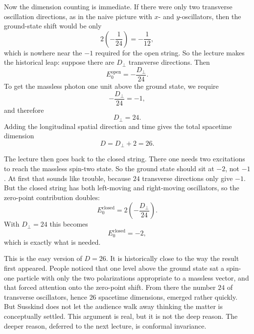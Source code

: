 Now the dimension counting is immediate. If there were only two transverse oscillation directions, as in the naive picture with \(x\)- and \(y\)-oscillators, then the ground-state shift would be only
\begin{equation}
2\left(-\frac{1}{24}\right)=-\frac{1}{12},
\end{equation}
which is nowhere near the \(-1\) required for the open string. So the lecture makes the historical leap: suppose there are \(D_{\perp}\) transverse directions. Then
\begin{equation}
E_{0}^{\text{open}}=-\frac{D_{\perp}}{24}.
\end{equation}
To get the massless photon one unit above the ground state, we require
\begin{equation}
-\frac{D_{\perp}}{24}=-1,
\end{equation}
and therefore
\begin{equation}
D_{\perp}=24.
\end{equation}
Adding the longitudinal spatial direction and time gives the total spacetime dimension
\begin{equation}
D=D_{\perp}+2=26.
\end{equation}

The lecture then goes back to the closed string. There one needs two excitations to reach the massless spin-two state. So the ground state should sit at \(-2\), not \(-1\). At first that sounds like trouble, because \(24\) transverse directions only give \(-1\). But the closed string has both left-moving and right-moving oscillators, so the zero-point contribution doubles:
\begin{equation}
E_{0}^{\text{closed}}
=
2\left(-\frac{D_{\perp}}{24}\right).
\end{equation}
With \(D_{\perp}=24\) this becomes
\begin{equation}
E_{0}^{\text{closed}}=-2,
\end{equation}
which is exactly what is needed.

This is the easy version of \(D=26\). It is historically close to the way the result first appeared. People noticed that one level above the ground state sat a spin-one particle with only the two polarizations appropriate to a massless vector, and that forced attention onto the zero-point shift. From there the number \(24\) of transverse oscillators, hence \(26\) spacetime dimensions, emerged rather quickly. But Susskind does not let the audience walk away thinking the matter is conceptually settled. This argument is real, but it is not the deep reason. The deeper reason, deferred to the next lecture, is conformal invariance.

